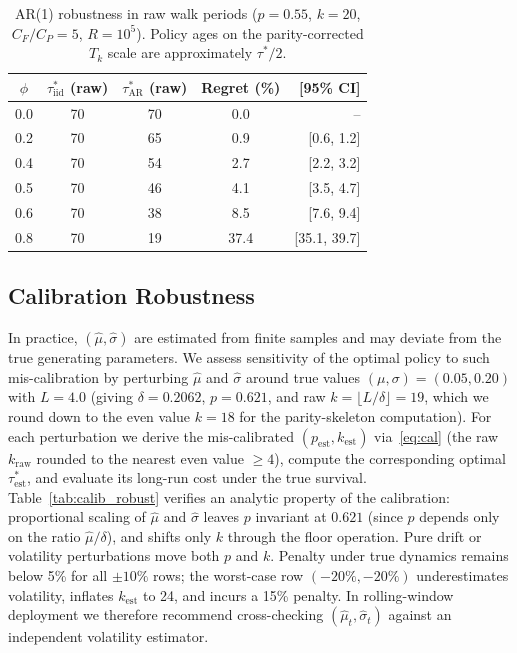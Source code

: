 \documentclass[pdflatex,sn-mathphys-num]{sn-jnl}
\theoremstyle{definition}
\numberwithin{equation}{section}
\begin{document}
\begin{table}[htbp]
\centering
\caption{AR(1) robustness in raw walk periods ($p{=}0.55$, $k{=}20$, $C_F/C_P{=}5$, $R{=}10^5$). Policy ages on the parity-corrected $T_k$ scale are approximately $\tau^*/2$.}
\label{tab:ar1}
\small
\begin{tabular}{ccccr}
\toprule
$\phi$ & $\tau^*_{\mathrm{iid}}$ (raw) & $\tau^*_{\mathrm{AR}}$ (raw) & Regret (\%) & [95\% CI] \\
\midrule
0.0 & 70 & 70 & 0.0 & -- \\
0.2 & 70 & 65 & 0.9 & [0.6, 1.2] \\
0.4 & 70 & 54 & 2.7 & [2.2, 3.2] \\
0.5 & 70 & 46 & 4.1 & [3.5, 4.7] \\
0.6 & 70 & 38 & 8.5 & [7.6, 9.4] \\
0.8 & 70 & 19 & 37.4 & [35.1, 39.7] \\
\bottomrule
\end{tabular}
\end{table}

\subsection{Calibration Robustness}

In practice, $(\hat\mu,\hat\sigma)$ are estimated from finite samples and may deviate from the true generating parameters. We assess sensitivity of the optimal policy to such mis-calibration by perturbing $\hat\mu$ and $\hat\sigma$ around true values $(\mu,\sigma)=(0.05,0.20)$ with $L=4.0$ (giving $\delta=0.2062$, $p=0.621$, and raw $k=\lfloor L/\delta\rfloor=19$, which we round down to the even value $k=18$ for the parity-skeleton computation). For each perturbation we derive the mis-calibrated $(p_{\mathrm{est}},k_{\mathrm{est}})$ via~\eqref{eq:cal} (the raw $k_{\mathrm{raw}}$ rounded to the nearest even value $\ge 4$), compute the corresponding optimal $\tau^*_{\mathrm{est}}$, and evaluate its long-run cost under the true survival. Table~\ref{tab:calib_robust} verifies an analytic property of the calibration: proportional scaling of $\hat\mu$ and $\hat\sigma$ leaves $p$ invariant at $0.621$ (since $p$ depends only on the ratio $\hat\mu/\delta$), and shifts only $k$ through the floor operation. Pure drift or volatility perturbations move both $p$ and $k$. Penalty under true dynamics remains below 5\% for all $\pm 10\%$ rows; the worst-case row $(-20\%,-20\%)$ underestimates volatility, inflates $k_{\mathrm{est}}$ to 24, and incurs a 15\% penalty. In rolling-window deployment we therefore recommend cross-checking $(\hat\mu_t,\hat\sigma_t)$ against an independent volatility estimator.
\end{document}
